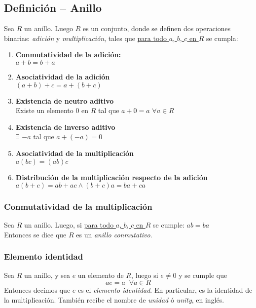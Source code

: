 \documentclass[../main.tex]{subfiles}
\begin{document}
    \subsection{Definición -- Anillo} {
        Sea $R$ un anillo. Luego $R$ es un conjunto, donde se definen dos operaciones binarias: \textit{adición} y \textit{multiplicación}, tales que \ul{para todo $a$, $b$, $c$ en $R$} se cumpla:
            \begin{enumerate}
                \item { \textbf{Conmutatividad de la adición:} \\ 
                $a + b = b + a$ }
                
                \item { \textbf{Asociatividad de la adición} \\ 
                $(a+b)+c = a + (b+c)$ }
                
                \item { \textbf{Existencia de neutro aditivo} \\
                Existe un elemento 0 en $R$ tal que $a + 0 = a$  $\forall a \in R$ }
                
                \item { \textbf{Existencia de inverso aditivo} \\
                $\exists$ $-a$ tal que $ a + (-a) = 0$ }
                
                \item { \textbf{Asociatividad de la multiplicación} \\ $a (bc) = (ab) c$ }
                
                \item { \textbf{Distribución de la multiplicación respecto de la adición} \\ $a(b+c) = ab + ac \land (b+c)a = ba+ca$ }
            \end{enumerate}
            
        \subsubsection{Conmutatividad de la multiplicación} {
            Sea $R$ un anillo. Luego, si \ul{para todo $a$, $b$, $c$ en $R$} se cumple: $ab = ba$ \\ Entonces se dice que $R$ es un \textit{anillo conmutativo}.
        }
        
        \subsubsection{Elemento identidad} {
            Sea $R$ un anillo, y sea $e$ un elemento de $R$, luego si $e \neq 0$ y
            se cumple que
            \begin{equation*} { ae = a \;\; \forall a \in R } \end{equation*}
            Entonces decimos que $e$ es el \textit{elemento identidad}. En particular, es la identidad de la multiplicación. También recibe el nombre de \textit{unidad} ó \textit{unity}, en inglés.
        }
        
}
\end{document}
